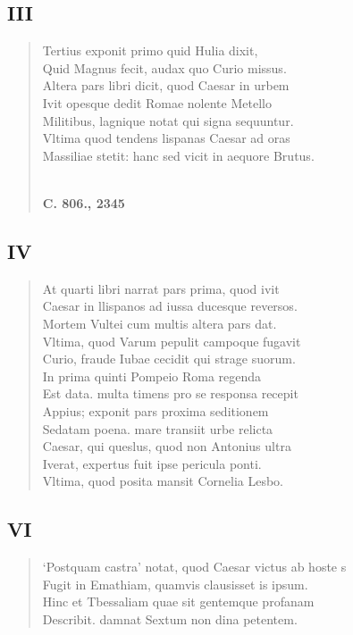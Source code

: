 \documentclass[11pt, a4paper]{report}
\begin{document}
            \subsection*{III}
      \begin{verse}
      Tertius exponit primo quid Hulia dixit, \\ Quid Magnus fecit, audax quo Curio missus. \\ Altera pars libri dicit, quod Caesar in urbem \\ Ivit opesque dedit Romae nolente Metello \\ Militibus, lagnique notat qui signa sequuntur. \\ Vltima quod tendens lispanas Caesar ad oras \\ Massiliae stetit: hanc sed vicit in aequore Brutus. \\ 
        ﻿\pagebreak 
    \begin{center} \textbf{C. 806., 2345} \end{center} \marginpar{[280]} 
      \end{verse}
  
            \subsection*{IV}
      \begin{verse}
      At quarti libri narrat pars prima, quod ivit \\ Caesar in llispanos ad iussa ducesque reversos. \\ Mortem Vultei cum multis altera pars dat. \\ Vltima, quod Varum pepulit campoque fugavit \\ Curio, fraude Iubae cecidit qui strage suorum. \\ In prima quinti Pompeio Roma regenda \\ Est data. multa timens pro se responsa recepit \\ Appius; exponit pars proxima seditionem \\ Sedatam poena. mare transiit urbe relicta \\ Caesar, qui queslus, quod non Antonius ultra \\ Iverat, expertus fuit ipse pericula ponti. \\ Vltima, quod posita mansit Cornelia Lesbo. \\ 
      \end{verse}
  
            \subsection*{VI}
      \begin{verse}
      ‘Postquam castra’ notat, quod Caesar victus ab hoste s \\ Fugit in Emathiam, quamvis clausisset is ipsum. \\ Hinc et Tbessaliam quae sit gentemque profanam \\ Describit. damnat Sextum non dina petentem. \\ 
      \end{verse}
  
\end{document}
